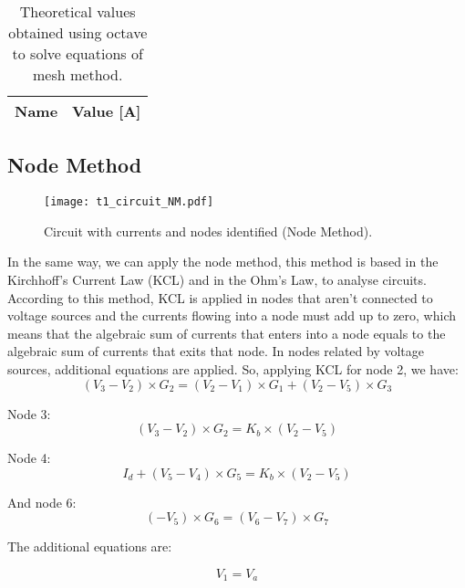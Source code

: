 \begin{table}[h]
  \centering
  \begin{tabular}{|l|r|}
    \hline    
    {\bf Name} & {\bf Value [A]} \\ \hline
    
  \end{tabular}
  \caption{Theoretical values obtained using octave to solve equations of mesh method.}
  \label{tab:MM}
\end{table}


\subsection{Node Method}

\begin{figure}[h] \centering
\texttt{[image: t1\_circuit\_NM.pdf]}
\caption{Circuit with currents and nodes identified (Node Method).}
\label{fig:t1_circuit_NM}
\end{figure}

In the same way, we can apply the node method, this method is based in the Kirchhoff's Current Law (KCL) and in the Ohm's Law, to analyse circuits. According to this method, KCL is applied in nodes that aren't connected to voltage sources and the currents flowing into a node must add up to zero, which means that the algebraic sum of currents that enters into a node equals to the algebraic sum of currents that exits that node. In nodes related by voltage sources, additional equations are applied. 
So, applying KCL for node 2, we have:
\begin {equation}
  (V_3 - V_2)\times G_2 = (V_2 - V_1)\times G_1 + (V_2 - V_5)\times G_3
  \label {eq:kvl}
\end{equation}

Node 3:
\begin{equation}
(V_3- V_2)\times G_2 = K_b\times (V_2 - V_5)
  \label {eq:kvl}
\end{equation}

Node 4:
\begin {equation}
I_d + (V_5 - V_4)\times G_5 = K_b\times (V_2 - V_5)
  \label {eq:kvl}
\end{equation}

And node 6:
\begin {equation}
(-V_5)\times G_6 = (V_6 - V_7)\times G_7
  \label {eq:kvl}
\end{equation}

The additional equations are:

\begin {equation}
V_1= V_a
  \label {eq:kvl}
\end{equation}

